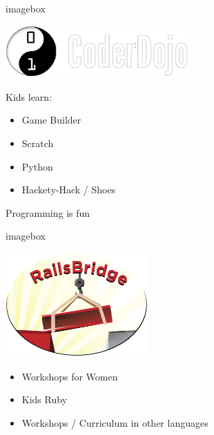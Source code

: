 \documentclass[20pt,aspectratio=169]{beamer}
\begin{document}
\begin{frame}
\begin{beamercolorbox}{imagebox}
\vspace{5mm}\par
\centering\includegraphics[height=2cm]{coderdojo_logo}\par
\vspace{5mm}\par
\end{beamercolorbox}
Kids learn:
\begin{itemize}
\item Game Builder
\item Scratch
\item Python
\item Hackety-Hack / Shoes
\end{itemize}
\end{frame}

\begin{frame}
\par{}Programming is fun
\end{frame}

\begin{frame}
\begin{beamercolorbox}{imagebox}
\vspace{2mm}\par
\centering\includegraphics[height=4cm]{railsbridge_logo}\par
\vspace{2mm}\par
\end{beamercolorbox}
\begin{itemize}
\item Workshops for Women
\item Kids Ruby
\item Workshops / Curriculum in other languages
\end{itemize}
\end{frame}
\end{document}
